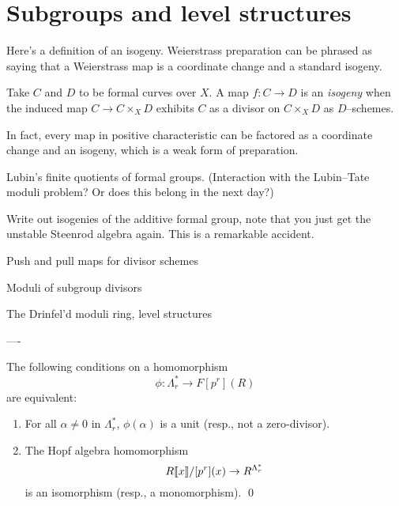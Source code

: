 \section{Subgroups and level structures}


Here's a definition of an isogeny.  Weierstrass preparation can be phrased as saying that a Weierstrass map is a coordinate change and a standard isogeny.
\begin{definition}
Take $C$ and $D$ to be formal curves over $X$.  A map $f: C \to D$ is an \textit{isogeny} when the induced map $C \to C \times_X D$ exhibits $C$ as a divisor on $C \times_X D$ as $D$--schemes.
\end{definition}




In fact, every map in positive characteristic can be factored as a coordinate change and an isogeny, which is a weak form of preparation.


Lubin's finite quotients of formal groups. (Interaction with the Lubin--Tate moduli problem?  Or does this belong in the next day?)


Write out isogenies of the additive formal group, note that you just get the unstable Steenrod algebra again.  This is a remarkable accident.


Push and pull maps for divisor schemes


Moduli of subgroup divisors


The Drinfel'd moduli ring, level structures

----

\begin{lemma}
The following conditions on a homomorphism \[\phi: \Lambda_r^* \to F[p^r](R)\] are equivalent:
\begin{enumerate}
\item For all $\alpha \ne 0$ in $\Lambda_r^*$, $\phi(\alpha)$ is a unit (resp., not a zero-divisor).
\item The Hopf algebra homomorphism \[R\llbracket{x}\rrbracket / [p^r](x) \to R^{\Lambda_r^*}\] is an isomorphism (resp., a monomorphism). \qed
\end{enumerate}
\end{lemma}

